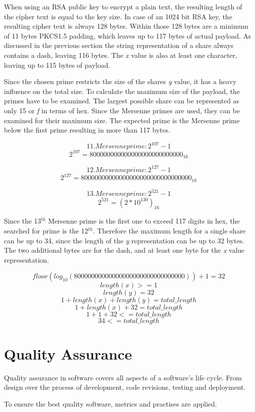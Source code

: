 When using an RSA public key to encrypt a plain text, the resulting length of
the cipher text is equal to the key size. In case of an 1024 bit RSA key, the
resulting cipher text is always 128 bytes. Within those 128 bytes are a minimum
of 11 bytes PKCS1.5 padding, which leaves up to 117 bytes of actual payload. As
discussed in the previous section the string representation of a share always
contains a dash, leaving 116 bytes. The \textit{x} value is also at least one
character, leaving up to 115 bytes of payload.

Since the chosen prime restricts the size of the shares \textit{y} value, it
has a heavy influence on the total size. To calculate the maximum size of the
payload, the primes have to be examined. The largest possible share can be
represented as only 15 or \textit{f} in terms of hex. Since the Mersenne primes
are used, they can be examined for their maximum size. The expected prime is
the Mersenne prime below the first prime resulting in more than 117 bytes.

$$11. Mersenne prime: 2^{107}-1$$
$$2^{107} = 800000000000000000000000000_{16}$$

$$12. Mersenne prime: 2^{127}-1$$
$$2^{127} = 80000000000000000000000000000000_{16}$$

$$13. Mersenne prime: 2^{521}-1$$
$$2^{521} = (2*10^{130})_{16}$$

Since the 13$^{th}$ Mersenne prime is the first one to exceed 117 digits in
hex, the searched for prime is the 12$^{th}$. Therefore the maximum length for
a single share can be up to 34, since the length of the \textit{y}
representation can be up to 32 bytes. The two additional bytes are for the
dash, and at least one byte for the \textit{x} value representation.

$$floor(log_{10}(80000000000000000000000000000000)) + 1 = 32$$
$$length(x) >= 1$$
$$length(y) = 32$$
$$1 + length(x) + length(y) = total\_length$$
$$1 + length(x) + 32 = total\_length$$
$$1 + 1 + 32 <= total\_length$$
$$34 <= total\_length$$

\chapter{Quality Assurance}

Quality assurance in software covers all aspects of a software's life cycle.
From design over the process of development, code revisions, testing and
deployment.

To ensure the best quality software, metrics and practises are applied.


